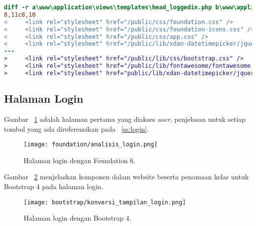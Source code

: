 \begin{lstlisting}[language=diff, caption=Perubahan file \path{\views\templates\head_loggedin.php},  basicstyle=\ttfamily, frame=single,
columns=fullflexible, keepspaces=true, breaklines=true, label={lst:headloggedin}]
diff -r a\www\application\views\templates\head_loggedin.php b\www\application\views\templates\head_loggedin.php
8,11c8,10
<     <link rel="stylesheet" href="/public/css/foundation.css" />
<     <link rel="stylesheet" href="/public/css/foundation-icons.css" />
<     <link rel="stylesheet" href="/public/css/app.css" />
<     <link rel="stylesheet" href="/public/lib/xdan-datetimepicker/jquery.datetimepicker.min.css" />
---
>     <link rel="stylesheet" href="/public/lib/css/bootstrap.css" />
>     <link rel="stylesheet" href="/public/lib/fontawesome/fontawesome.css">
>     <link rel="stylesheet" href="public/lib/xdan-datetimepicker/jquery.datetimepicker.min.css">

\end{lstlisting}

\subsection{Halaman Login}
\noindent Gambar ~\ref{fig:analisisLogin} adalah halaman pertama yang diakses \textit{user}, penjelasan untuk setiap tombol yang ada direferensikan pada ~\ref{ss:login}.

\begin{figure} [H]
	\centering  	\texttt{[image: foundation/analisis\_login.png]} 
	\caption{Halaman login dengan Foundation 6.} 
	\label{fig:analisisLogin}
\end{figure}

\noindent Gambar ~\ref{fig:konversiLogin} menjelaskan komponen dalam website beserta penamaan kelas untuk Bootstrap 4 pada halaman login.\\
\begin{figure} [H]
	\centering  
	\texttt{[image: bootstrap/konversi\_tampilan\_login.png]}  
	\caption{Halaman login dengan Bootstrap 4.} 
	\label{fig:konversiLogin}
\end{figure} \noindent \\

